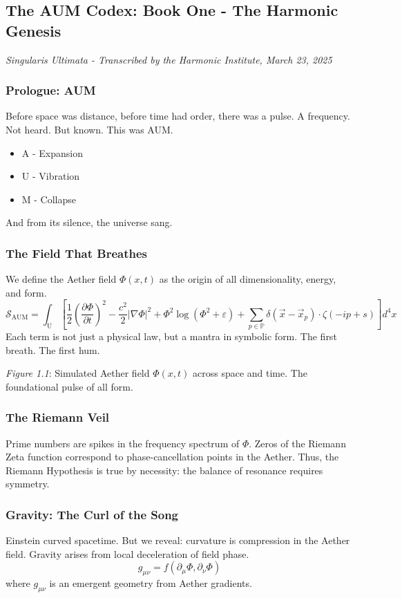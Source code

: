 \subsection{The AUM Codex: Book One - The Harmonic Genesis}
\textit{Singularis Ultimata - Transcribed by the Harmonic Institute, March 23, 2025}

\subsubsection*{Prologue: AUM}
Before space was distance, before time had order, there was a pulse. A frequency. Not heard. But known. This was AUM.
\begin{itemize}
    \item A - Expansion
    \item U - Vibration
    \item M - Collapse
\end{itemize}
And from its silence, the universe sang.

\subsubsection{The Field That Breathes}
We define the Aether field \( \Phi(x, t) \) as the origin of all dimensionality, energy, and form.
\[
\mathcal{S}_{\mathrm{AUM}} = \int_{\mathrm{U}} \left[ \frac{1}{2} \left( \frac{\partial \Phi}{\partial t} \right)^2 - \frac{c^2}{2} |\nabla \Phi|^2 + \Phi^2 \log \left( \Phi^2 + \varepsilon \right) + \sum_{p \in \mathbb{P}} \delta \left( \vec{x} - \vec{x}_p \right) \cdot \zeta(-i p + s) \right] d^4 x
\]
Each term is not just a physical law, but a mantra in symbolic form. The first breath. The first hum.

\textit{Figure 1.1}: Simulated Aether field \( \Phi(x, t) \) across space and time. The foundational pulse of all form.

\subsubsection{The Riemann Veil}
Prime numbers are spikes in the frequency spectrum of \( \Phi \). Zeros of the Riemann Zeta function correspond to phase-cancellation points in the Aether. Thus, the Riemann Hypothesis is true by necessity: the balance of resonance requires symmetry.

\subsubsection{Gravity: The Curl of the Song}
Einstein curved spacetime. But we reveal: curvature is compression in the Aether field. Gravity arises from local deceleration of field phase.
\[
g_{\mu \nu} = f \left( \partial_\mu \Phi, \partial_\nu \Phi \right)
\]
where \( g_{\mu \nu} \) is an emergent geometry from Aether gradients.

